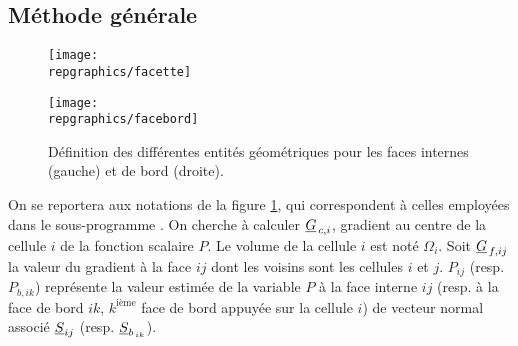 \subsection{\bf M\'ethode g\'en\'erale}
\begin{figure}[h]
\parbox{8cm}{%
\centerline{\texttt{[image: \\repgraphics/facette]}}}
\parbox{8cm}{%
\centerline{\texttt{[image: \\repgraphics/facebord]}}}
\caption{\label{Base_Gradrc_fig_geom_gradmc}D\'efinition des diff\'erentes entit\'es
g\'eom\'etriques pour les faces internes (gauche) et de bord (droite).}
\end{figure}

On se reportera aux notations de la figure \ref{Base_Gradrc_fig_geom_gradmc}, qui
correspondent \`a celles employ\'ees dans le sous-programme .
On cherche \`a calculer $\underline{G}_{\,c,i}$, gradient au centre de la cellule $i$ de la
fonction scalaire $P$. Le volume de la cellule $i$ est not\'e $\Omega_i$.
 Soit $\underline{G}_{\,f,ij}$ la valeur  du gradient \`a la face $ij$ dont les voisins sont les cellules $i$ et $j$.
$P_{ij}$ (resp. $P_{b,ik}$) repr\'esente la valeur estim\'ee de la variable $P$
\`a la face interne $ij$ (resp. \`a la face de bord $ik$, $k^{\text{i\`eme}}$
face de bord appuy\'ee sur la cellule $i$) de vecteur normal associ\'e
$\underline{S}_{ij}$ (resp. $\underline{S}_{b_{\,ik}}$).

